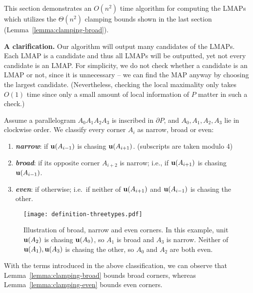 \documentclass{ws-ijcga}
\begin{document}
This section demonstrates an $O(n^2)$ time algorithm for computing the LMAPs which utilizes the $\Theta(n^2)$ clamping bounds shown in the last section (Lemma~\ref{lemma:clamping-broad}).

\smallskip \noindent \textbf{A clarification.} Our algorithm will output many candidates of the LMAPs.
  Each LMAP is a candidate and thus all LMAPs will be outputted, yet not every candidate is an LMAP.
  For simplicity, we do not check whether a candidate is an LMAP or not,
    since it is unnecessary -- we can find the MAP anyway by choosing the largest candidate.
    (Nevertheless, checking the local maximality only takes $O(1)$ time since only a small amount of local information of $P$ matter in such a check.)

\begin{definition}\label{def:classification}
Assume a parallelogram $A_0A_1A_2A_3$ is inscribed in $\partial P$, and $A_0,A_1,A_2,A_3$ lie in clockwise order.
We classify every corner $A_i$ as narrow, broad or even:
\begin{enumerate}
\item[] \textbf{\emph{narrow}}: if $\mathbf{u}(A_{i-1})$ is chasing $\mathbf{u}(A_{i+1})$. (subscripts are taken modulo 4)
\item[]  \textbf{\emph{broad}}: if its opposite corner $A_{i+2}$ is narrow; i.e., if $\mathbf{u}(A_{i+1})$ is chasing $\mathbf{u}(A_{i-1})$.
\item[]  \textbf{\emph{even}}: if otherwise; i.e.\ if neither of $\mathbf{u}(A_{i+1})$ and $\mathbf{u}(A_{i-1})$ is chasing the other.
\end{enumerate}
\end{definition}

\begin{figure}[h]
\centering\texttt{[image: definition-threetypes.pdf]}
\caption{Illustration of broad, narrow and even corners.
In this example, unit $\mathbf{u}(A_2)$ is chasing $\mathbf{u}(A_0)$,
so $A_1$ is broad and $A_3$ is narrow.
Neither of $\mathbf{u}(A_1),\mathbf{u}(A_3)$ is chasing the other,
so $A_0$ and $A_2$ are both even.}\label{fig:threetypes}
\end{figure}

\begin{remark}
With the terms introduced in the above classification,
  we can observe that Lemma~\ref{lemma:clamping-broad} bounds broad corners, whereas Lemma~\ref{lemma:clamping-even} bounds even corners.
\end{remark}
\end{document}
